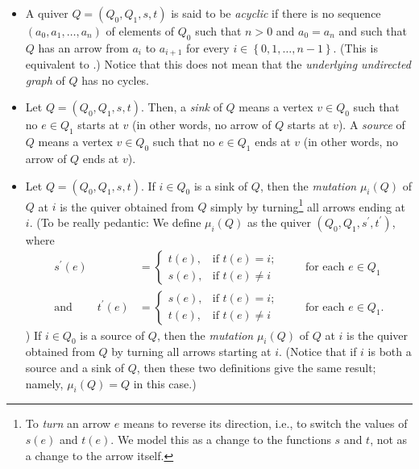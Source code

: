 \documentclass[numbers=enddot,12pt,final,onecolumn,notitlepage]{scrartcl}%
\numberwithin{exer}{section}
\theoremstyle{definition}
\begin{document}
\begin{itemize}
\item A quiver $Q=\left(  Q_{0},Q_{1},s,t\right)  $ is said to be
\textit{acyclic} if there is no sequence \newline$\left(  a_{0},a_{1}%
,\ldots,a_{n}\right)  $ of elements of $Q_{0}$ such that $n>0$ and
$a_{0}=a_{n}$ and such that $Q$ has an arrow from $a_{i}$ to $a_{i+1}$ for
every $i\in\left\{  0,1,\ldots,n-1\right\}  $. (This is equivalent to
\cite[Definition 2.1.7]{Lampe}.) Notice that this does not mean that the
\textit{underlying undirected graph} of $Q$ has no cycles.

\item Let $Q=\left(  Q_{0},Q_{1},s,t\right)  $. Then, a \textit{sink} of $Q$
means a vertex $v\in Q_{0}$ such that no $e\in Q_{1}$ starts at $v$ (in other
words, no arrow of $Q$ starts at $v$). A \textit{source} of $Q$ means a vertex
$v\in Q_{0}$ such that no $e\in Q_{1}$ ends at $v$ (in other words, no arrow
of $Q$ ends at $v$).

\item Let $Q=\left(  Q_{0},Q_{1},s,t\right)  $. If $i\in Q_{0}$ is a sink of
$Q$, then the \textit{mutation} $\mu_{i}\left(  Q\right)  $ of $Q$ at $i$ is
the quiver obtained from $Q$ simply by turning\footnote{To \textit{turn} an
arrow $e$ means to reverse its direction, i.e., to switch the values of
$s\left(  e\right)  $ and $t\left(  e\right)  $. We model this as a change to
the functions $s$ and $t$, not as a change to the arrow itself.} all arrows
ending at $i$. (To be really pedantic: We define $\mu_{i}\left(  Q\right)  $
as the quiver $\left(  Q_{0},Q_{1},s^{\prime},t^{\prime}\right)  $, where%
\begin{align*}
s^{\prime}\left(  e\right)   &  =
\begin{cases}
t\left(  e\right)  , & \text{if }t\left(  e\right)  =i;\\
s\left(  e\right)  , & \text{if }t\left(  e\right)  \neq i
\end{cases}
\ \ \ \ \ \ \ \ \ \ \text{for each }e\in Q_{1}\\
\text{and}\ \ \ \ \ \ \ \ \ \ t^{\prime}\left(  e\right)   &  =
\begin{cases}
s\left(  e\right)  , & \text{if }t\left(  e\right)  =i;\\
t\left(  e\right)  , & \text{if }t\left(  e\right)  \neq i
\end{cases}
\ \ \ \ \ \ \ \ \ \ \text{for each }e\in Q_{1}.
\end{align*}
) If $i\in Q_{0}$ is a source of $Q$, then the \textit{mutation} $\mu
_{i}\left(  Q\right)  $ of $Q$ at $i$ is the quiver obtained from $Q$ by
turning all arrows starting at $i$. (Notice that if $i$ is both a source and a
sink of $Q$, then these two definitions give the same result; namely, $\mu
_{i}\left(  Q\right)  =Q$ in this case.)


\end{itemize}
\end{document}
